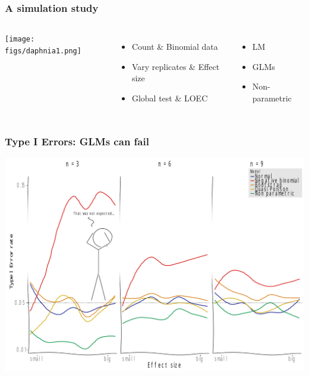 \documentclass[
	10pt
	]{beamer}
\begin{document}
\begin{frame}
\frametitle{A simulation study}
	\begin{columns}[T]
		\texttt{[image: figs/daphnia1.png]}
		\vspace{3.8em}
		\begin{itemize}
			\item Count \& Binomial data
			\item Vary replicates \& Effect size
			\item Global test \& LOEC
		\end{itemize}
		\begin{adjustbox}{max totalsize={\textwidth}{\textheight}}
					
		\end{adjustbox}
		\begin{itemize}
			\item LM
			\item GLMs
			\item Non-parametric
		\end{itemize}
	\end{columns}
\end{frame}



\begin{frame}
\frametitle{Type I Errors: GLMs can fail}
	\begin{center}
		\includegraphics[width=\textwidth]{figs/p_t1_xkcd.pdf}
	\end{center}
\end{frame}
\end{document}
